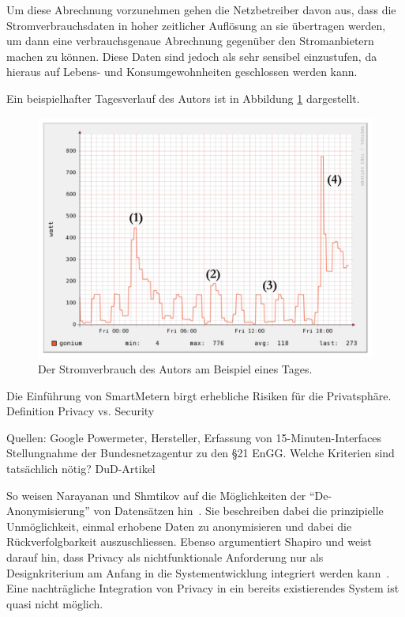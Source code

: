 \documentclass[12pt,BCOR=8.5mm]{scrartcl}
\begin{document}
Um diese Abrechnung vorzunehmen gehen die Netzbetreiber davon aus, dass
die Stromverbrauchsdaten in hoher zeitlicher Auflösung an sie übertragen
werden, um dann eine verbrauchsgenaue Abrechnung gegenüber den
Stromanbietern machen zu können. Diese Daten sind jedoch als sehr
sensibel einzustufen, da hieraus auf Lebens- und Konsumgewohnheiten
geschlossen werden kann. 

Ein beispielhafter Tagesverlauf des Autors ist in Abbildung
\ref{fig:schlaflos} dargestellt.
\begin{figure}[htbp]
  \begin{center}
    \includegraphics[width=12cm]{figures/lastkurve-md-annotated.png}
    \caption{Der Stromverbrauch des Autors am Beispiel eines Tages.}
    \label{fig:schlaflos}
  \end{center}
\end{figure}





Die Einführung von SmartMetern birgt erhebliche Risiken für die
Privatsphäre. Definition Privacy vs. Security

Quellen: Google Powermeter, Hersteller, Erfassung von
15-Minuten-Interfaces
Stellungnahme der Bundesnetzagentur zu den §21 EnGG. Welche Kriterien
sind tatsächlich nötig?
DuD-Artikel


So weisen Narayanan und Shmtikov auf die Möglichkeiten der
``De-Anonymisierung'' von Datensätzen hin~\cite{narayanan2010pii}. Sie
beschreiben dabei die prinzipielle Unmöglichkeit, einmal erhobene Daten
zu anonymisieren und dabei die Rückverfolgbarkeit auszuschliessen.
Ebenso argumentiert Shapiro und weist darauf hin, dass Privacy als
nichtfunktionale Anforderung nur als Designkriterium am Anfang in die
Systementwicklung integriert werden kann~\cite{shapiro2010privacy}. Eine
nachträgliche Integration von Privacy in ein bereits existierendes
System ist quasi nicht möglich.
\end{document}
